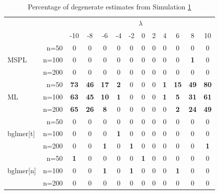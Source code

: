 \documentclass[11pt, a4paper]{article}
\newcommand*{\bb}{\boldsymbol}
\theoremstyle{example} \newtheorem{example}{Example}[section]
\theoremstyle{theorem} \newtheorem{theorem}{Theorem}[section]
\theoremstyle{theorem }\newtheorem{proposition}{Proposition}[section]
\theoremstyle{theorem }\newtheorem{corollary}{Corollary}[section]
\def\\bbeta{\bb{\\bbeta}}
\begin{document}
\begin{table}[H]
	\centering
	\caption{Percentage of degenerate estimates from Simulation \hyperref[sec:sim1]{1}} 
	\label{tab:sim1}
	\begin{tabular}{lrccccccccccc}
		\toprule 
		&& \multicolumn{11}{c}{$\lambda$} \\ \cmidrule{3-13} 
		&  & -10 & -8 & -6 & -4 & -2 & 0 & 2 & 4 & 6 & 8 & 10 \\ 
		\cmidrule{3-13} 
		& n=50 & 0 & 0 & 0 & 0 & 0 & 0 & 0 & 0 & 0 & 0 & 0 \\ 
		MSPL & n=100 & 0 & 0 & 0 & 0 & 0 & 0 & 0 & 0 & 0 & \textbf{1} & 0 \\ 
		& n=200 & 0 & 0 & 0 & 0 & 0 & 0 & 0 & 0 & 0 & 0 & 0 \\ 
		\cmidrule{3-13} 
		& n=50 & \textbf{73} & \textbf{46} & \textbf{17} & \textbf{2} & 0 & 0 & 0 & \textbf{1} & \textbf{15} & \textbf{49} & \textbf{80} \\ 
		ML & n=100 & \textbf{63} & \textbf{45} & \textbf{10} & \textbf{1} & 0 & 0 & 0 & \textbf{1} & \textbf{5} & \textbf{31} & \textbf{61} \\ 
		& n=200 & \textbf{65} & \textbf{26} & \textbf{8} & 0 & 0 & 0 & 0 & 0 & \textbf{2} & \textbf{24} & \textbf{49} \\ 
		\cmidrule{3-13} 
		& n=50 & 0 & 0 & 0 & 0 & 0 & 0 & 0 & 0 & 0 & 0 & 0 \\ 
		bglmer[t] & n=100 & 0 & 0 & 0 & \textbf{1} & 0 & 0 & 0 & 0 & 0 & 0 & 0 \\ 
		& n=200 & 0 & 0 & \textbf{1} & 0 & \textbf{1} & 0 & 0 & 0 & 0 & 0 & \textbf{1} \\ 
		\cmidrule{3-13} 
		& n=50 & \textbf{1} & 0 & 0 & 0 & 0 & \textbf{1} & 0 & 0 & 0 & 0 & 0 \\ 
		bglmer[n] & n=100 & 0 & 0 & \textbf{1} & 0 & \textbf{1} & 0 & 0 & 0 & \textbf{1} & 0 & 0 \\ 
		& n=200 & 0 & 0 & 0 & 0 & 0 & 0 & 0 & 0 & 0 & 0 & 0 \\ 
		\bottomrule 
	\end{tabular}
\end{table}
\end{document}
